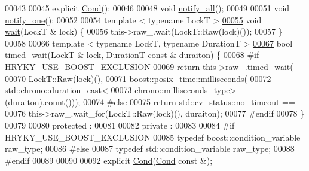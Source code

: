\begin{DoxyCode}
00043 
00045     \textcolor{keyword}{explicit} \hyperlink{classhryky_1_1exclusion_1_1_cond_a7bbd3a836576e749c0904e1e327929d0}{Cond}();
00046 
00048     \textcolor{keywordtype}{void} \hyperlink{classhryky_1_1exclusion_1_1_cond_a2242452f0deecbf3aa838e72d2e8ec82}{notify_all}();
00049 
00051     \textcolor{keywordtype}{void} \hyperlink{classhryky_1_1exclusion_1_1_cond_acec5fdebb28d5061614c2b9dbaf5ee5e}{notify_one}();
00052 
00054     \textcolor{keyword}{template} < \textcolor{keyword}{typename} LockT >
\hypertarget{exclusion__cond_8h_source_l00055}{}\hyperlink{classhryky_1_1exclusion_1_1_cond_a55dcfec9c6dfc6e790235465f2951b42}{00055}     \textcolor{keywordtype}{void} \hyperlink{classhryky_1_1exclusion_1_1_cond_a55dcfec9c6dfc6e790235465f2951b42}{wait}(LockT & lock) \{
00056         this->raw\_.wait(LockT::Raw(lock)());
00057     \}
00058 
00066     \textcolor{keyword}{template} < \textcolor{keyword}{typename} LockT, \textcolor{keyword}{typename} DurationT >
\hypertarget{exclusion__cond_8h_source_l00067}{}\hyperlink{classhryky_1_1exclusion_1_1_cond_aab61983ff7561b9594744f02942a28b6}{00067}     \textcolor{keywordtype}{bool} \hyperlink{classhryky_1_1exclusion_1_1_cond_aab61983ff7561b9594744f02942a28b6}{timed_wait}(LockT & lock, DurationT \textcolor{keyword}{const} & duraiton) \{
00068 \textcolor{preprocessor}{#if HRYKY\_USE\_BOOST\_EXCLUSION}
00069 \textcolor{preprocessor}{}        \textcolor{keywordflow}{return} this->raw\_.timed\_wait(
00070             LockT::Raw(lock)(),
00071             boost::posix\_time::milliseconds(
00072                 std::chrono::duration\_cast<
00073                 chrono::milliseconds\_type>(duraiton).count()));
00074 \textcolor{preprocessor}{#else}
00075 \textcolor{preprocessor}{}        \textcolor{keywordflow}{return} std::cv\_status::no\_timeout ==
00076             this->raw\_.wait\_for(LockT::Raw(lock)(), duraiton);
00077 \textcolor{preprocessor}{#endif}
00078 \textcolor{preprocessor}{}    \}
00079 
00080 \textcolor{keyword}{protected} :
00081 
00082 \textcolor{keyword}{private} :
00083 
00084 \textcolor{preprocessor}{#if HRYKY\_USE\_BOOST\_EXCLUSION}
00085 \textcolor{preprocessor}{}    \textcolor{keyword}{typedef} boost::condition\_variable raw\_type;
00086 \textcolor{preprocessor}{#else}
00087 \textcolor{preprocessor}{}    \textcolor{keyword}{typedef} std::condition\_variable   raw\_type;
00088 \textcolor{preprocessor}{#endif}
00089 \textcolor{preprocessor}{}    
00090 
00092     \textcolor{keyword}{explicit} \hyperlink{classhryky_1_1exclusion_1_1_cond_a7bbd3a836576e749c0904e1e327929d0}{Cond}(\hyperlink{classhryky_1_1exclusion_1_1_cond}{Cond} \textcolor{keyword}{const} &);

\end{DoxyCode}
